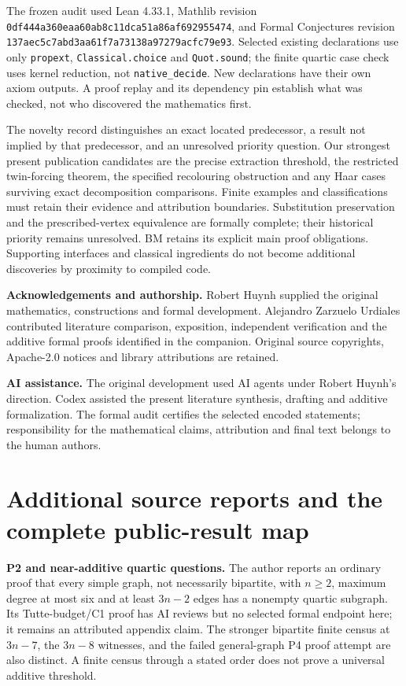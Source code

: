 \documentclass[smallextended]{svjour3}
\newcounter{none} %
\begin{document}
The frozen audit used Lean 4.33.1, Mathlib revision
{\ttfamily\nolinkurl{0df444a360eaa60ab8c11dca51a86af692955474}}, and Formal
Conjectures revision {\ttfamily\nolinkurl{137aec5c7abd3aa61f7a73138a97279acfc79e93}}.
Selected existing declarations use only \texttt{propext},
\texttt{Classical.choice} and \texttt{Quot.sound}; the finite quartic
case check uses kernel reduction, not \texttt{native\_decide}. New
declarations have their own axiom outputs. A proof replay and its
dependency pin establish what was checked, not who discovered the
mathematics first.

The novelty record distinguishes an exact located predecessor, a result
not implied by that predecessor, and an unresolved priority question.
Our strongest present publication candidates are the precise extraction
threshold, the restricted twin-forcing theorem, the specified
recolouring obstruction and any Haar cases surviving exact decomposition
comparisons. Finite examples and classifications must retain their
evidence and attribution boundaries. Substitution preservation and the
prescribed-vertex equivalence are formally complete; their historical
priority remains unresolved. BM retains its explicit main proof
obligations. Supporting interfaces and classical ingredients do not
become additional discoveries by proximity to compiled code.

\textbf{Acknowledgements and authorship.} Robert Huynh supplied the
original mathematics, constructions and formal development. Alejandro
Zarzuelo Urdiales contributed literature comparison, exposition,
independent verification and the additive formal proofs identified in
the companion. Original source copyrights, Apache-2.0 notices and
library attributions are retained.

\textbf{AI assistance.} The original development used AI agents under
Robert Huynh's direction. Codex assisted the present literature
synthesis, drafting and additive formalization. The formal audit
certifies the selected encoded statements; responsibility for the
mathematical claims, attribution and final text belongs to the human
authors.

\appendix
\section{Additional source reports and the complete
public-result
map}\label{appendix-a.-additional-source-reports-and-the-complete-public-result-map}

\textbf{P2 and near-additive quartic questions.} The author reports an
ordinary proof that every simple graph, not necessarily bipartite, with
\(n\ge2\), maximum degree at most six and at least \(3n-2\) edges has a
nonempty quartic subgraph. Its Tutte-budget/C1 proof has AI reviews but
no selected formal endpoint here; it remains an attributed appendix
claim. The stronger bipartite finite census at \(3n-7\), the \(3n-8\)
witnesses, and the failed general-graph P4 proof attempt are also
distinct. A finite census through a stated order does not prove a
universal additive threshold.
\end{document}
